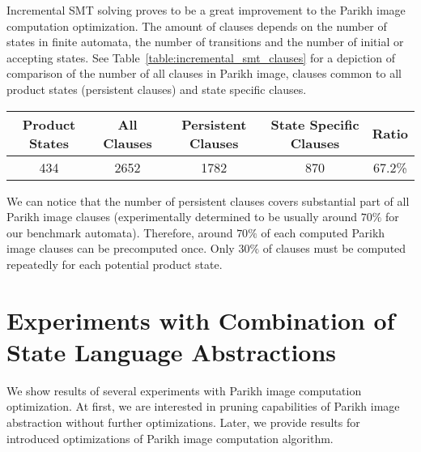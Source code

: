Incremental SMT solving proves to be a great improvement to the Parikh image computation optimization. The amount of clauses depends on the number of states in finite automata, the number of transitions and the number of initial or accepting states. See Table~\ref{table:incremental_smt_clauses} for a depiction of comparison of the number of all clauses in Parikh image, clauses common to all product states (persistent clauses) and state specific clauses.

\begin{table*}[ht]
	\centering
    \begin{tabular}{ |c|c|c|c|c| }
        \hline
        Product States & All Clauses & Persistent Clauses & State Specific Clauses & Ratio \\ \hline
        434 & 2652 & 1782 & 870 & 67.2\% \\ \hline
    \end{tabular}
    \caption{An example proportion of persistent and state specific clauses in Parikh image computation with incremental SMT solving optimization. The \emph{Product States} column shows the number of product states in the whole intersection product, the \emph{All Clauses} column shows the number of clauses in each computed Parikh image, the \emph{Persistent Clauses} column shows the number of persistent clauses in the whole Parikh image (out of the all Parikh image clauses), \emph{State Specific Clauses} column states how many Parikh image clauses have to be recomputed for each product state and \emph{Ratio} column shows the ratio of persistent clauses in all Parikh image clauses.}
    \label{table:incremental_smt_clauses}
\end{table*}

We can notice that the number of persistent clauses covers substantial part of all Parikh image clauses (experimentally determined to be usually around $70 \%$ for our benchmark automata). Therefore, around $70\%$ of each computed Parikh image clauses can be precomputed once. Only $30\%$ of clauses must be computed repeatedly for each potential product state.

\section{Experiments with Combination of State Language Abstractions}

We show results of several experiments with Parikh image computation optimization. At first, we are interested in pruning capabilities of Parikh image abstraction without further optimizations. Later, we provide results for introduced optimizations of Parikh image computation algorithm.


